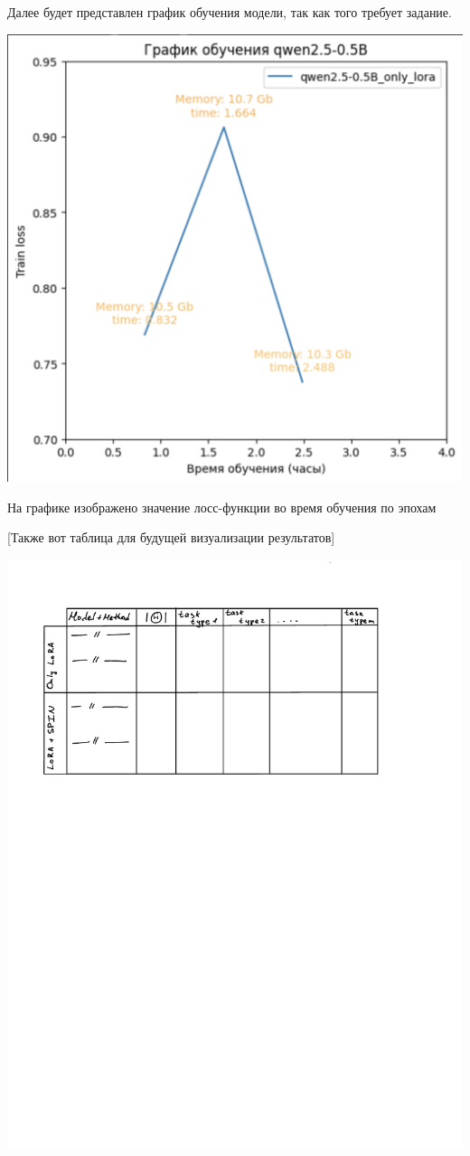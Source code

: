 \documentclass[12pt, twoside]{article}
\begin{document}
Далее будет представлен график обучения модели, так как того требует задание.

\includegraphics[scale=0.5]{images/qwen_training.pdf}

На графике изображено значение лосс-функции во время обучения по эпохам

[Также вот таблица для будущей визуализации результатов]

\includegraphics{images/table_draft.pdf}

\printbibliography
\end{document}
